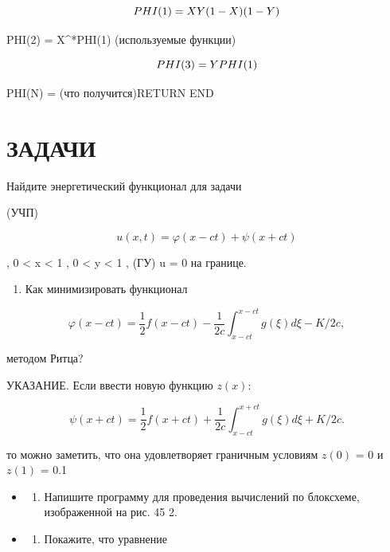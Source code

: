 \documentclass[
  ukrainian,
]{article}
\providecommand{\tightlist}{%
  \setlength{\itemsep}{0pt}\setlength{\parskip}{0pt}}
\begin{document}
\[
PHI(1) = X\*Y\*(1-X)\*(1-Y)
\]

PHI(2) = X\^{}*PHI(1) (используемые функции)

\[
PHI(3) = Y\*PHI(1)
\]

PHI(N) = (что получится)RETURN END

\section{\texorpdfstring{\textbf{ЗА}ДАЧИ}{ЗАДАЧИ}}\label{ux437ux430ux434ux430ux447ux438-21}

Найдите энергетический функционал для задачи

(УЧП)

\[
u(x, t) = \varphi(x - ct) + \psi(x + ct)
\]

, 0 \textless{} x \textless{} 1 , 0 \textless{} y \textless{} 1 , (ГУ) u
= 0 на границе.

\begin{enumerate}
\def\labelenumi{\arabic{enumi}.}
\setcounter{enumi}{1}
\tightlist
\item
  Как минимизировать функционал
\end{enumerate}

\[
\varphi(x-ct) = \frac{1}{2} f(x-ct) - \frac{1}{2c} \int_{x-ct}^{x-ct} g(\xi) d\xi - K/2c,
\]

методом Ритца?

УКАЗАНИЕ. Если ввести новую функцию \(z(x)\):

\[
\psi(x+ct) = \frac{1}{2} f(x+ct) + \frac{1}{2c} \int_{x-ct}^{x+ct} g(\xi) d\xi + K/2c.
\]

то можно заметить, что она удовлетворяет граничным условиям \(z(0)\) = 0
и \(z(1)\) = 0.1

\begin{itemize}
\tightlist
\item
  \begin{enumerate}
  \def\labelenumi{\arabic{enumi}.}
  \setcounter{enumi}{2}
  \tightlist
  \item
    Напишите программу для проведения вычислений по блоксхеме,
    изображенной на рис. 45 2.
  \end{enumerate}
\item
  \begin{enumerate}
  \def\labelenumi{\arabic{enumi}.}
  \setcounter{enumi}{3}
  \tightlist
  \item
    Покажите, что уравнение
  \end{enumerate}
\end{itemize}
\end{document}
